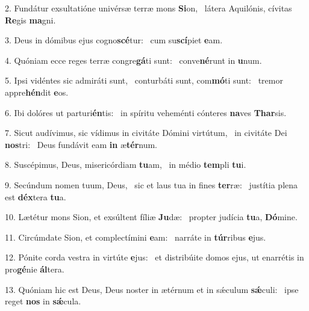 2. Fundátur exsultatióne univérsæ terræ mons \textbf{Si}on, \ast\  látera Aquilónis, cívitas \textbf{Re}gis \textbf{ma}gni.\

3. Deus in dómibus ejus cogno\textbf{scé}tur: \ast\  cum su\textbf{scí}piet \textbf{e}am.\

4. Quóniam ecce reges terræ congre\textbf{gá}ti sunt: \ast\  conve\textbf{né}runt in \textbf{u}num.\

5. Ipsi vidéntes sic admiráti sunt, \dag\  conturbáti sunt, com\textbf{mó}ti sunt: \ast\  tremor appre\textbf{hén}dit \textbf{e}os.\

6. Ibi dolóres ut parturi\textbf{én}tis: \ast\  in spíritu veheménti cónteres \textbf{na}ves \textbf{Thar}sis.\

7. Sicut audívimus, sic vídimus in civitáte Dómini virtútum, \dag\  in civitáte Dei \textbf{nos}tri: \ast\  Deus fundávit eam \textbf{in} æ\textbf{tér}num.\

8. Suscépimus, Deus, misericórdiam \textbf{tu}am, \ast\  in médio \textbf{tem}pli \textbf{tu}i.\

9. Secúndum nomen tuum, Deus, \dag\  sic et laus tua in fines \textbf{ter}ræ: \ast\  justítia plena est \textbf{déx}tera \textbf{tu}a.\

10. Lætétur mons Sion, et exsúltent fíliæ \textbf{Ju}dæ: \ast\  propter judícia \textbf{tu}a, \textbf{Dó}mine.\

11. Circúmdate Sion, et complectímini \textbf{e}am: \ast\  narráte in \textbf{túr}ribus \textbf{e}jus.\

12. Pónite corda vestra in virtúte \textbf{e}jus: \ast\  et distribúite domos ejus, ut enarrétis in pro\textbf{gé}nie \textbf{ál}tera.\

13. Quóniam hic est Deus, Deus noster in ætérnum et in sǽculum \textbf{sǽ}culi: \ast\  ipse reget \textbf{nos} in \textbf{sǽ}cula.\

